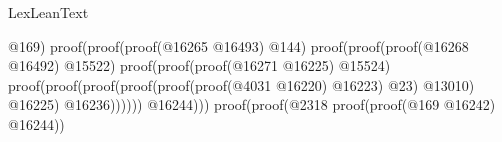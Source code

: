 \begin{lexlean}{LexLeanText}
\begin{coremodule}
                                                                                                      @169)
                                                                                                    proof(proof(proof(@16265
                                                                                                            @16493)
                                                                                                          @144)
                                                                                                        proof(proof(proof(@16268
                                                                                                                @16492)
                                                                                                              @15522)
                                                                                                            proof(proof(proof(@16271
                                                                                                                    @16225)
                                                                                                                  @15524)
                                                                                                                proof(proof(proof(proof(proof(proof(@4031
                                                                                                                              @16220)
                                                                                                                            @16223)
                                                                                                                          @23)
                                                                                                                        @13010)
                                                                                                                      @16225)
                                                                                                                    @16236))))))
                                                                                              @16244)))
                                                                                    proof(proof(@2318
                                                                                          proof(proof(@169
                                                                                                @16242)
                                                                                              @16244))

\end{coremodule}
\end{lexlean}
